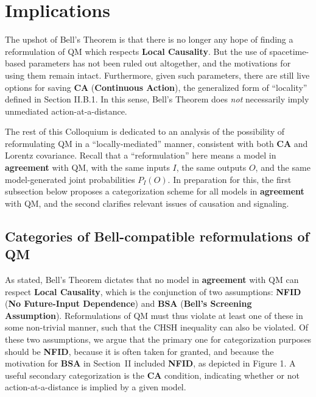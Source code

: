 \documentclass[onecolumn, nofootinbib, 12pt]{revtex4-1}
\begin{document}
\section{Implications}
\label{sec:aftermath}

The upshot of Bell's Theorem is that there is no longer any hope of finding a reformulation of QM which respects {\bf Local Causality}.  But the use of spacetime-based parameters has not been ruled out altogether, and the motivations for using them remain intact.  Furthermore, given such parameters, there are still live options for saving {\bf CA} ({\bf Continuous Action}), the generalized form of ``locality'' defined in Section II.B.1.  In this sense, Bell's Theorem does {\em not} necessarily imply unmediated action-at-a-distance.

The rest of this Colloquium is dedicated to an analysis of the possibility of reformulating QM in a ``locally-mediated'' manner, consistent with both {\bf CA} and Lorentz covariance.  Recall that a ``reformulation'' here means a model in {\bf agreement} with QM, with the same inputs $I$, the same outputs $O$, and the same model-generated joint probabilities $P_I(O)$.  In preparation for this, the first subsection below proposes a categorization scheme for all models in {\bf agreement} with QM, and the second clarifies relevant issues of causation and signaling.

\subsection{Categories of Bell-compatible reformulations of QM}
\label{sec:categories}

As stated, Bell's Theorem dictates that no model in {\bf agreement} with QM can respect {\bf Local Causality}, which is the conjunction of two assumptions: {\bf NFID} ({\bf No Future-Input Dependence}) and {\bf BSA} ({\bf Bell's Screening Assumption}).  Reformulations of QM must thus violate at least one of these in some non-trivial manner, such that the CHSH inequality can also be violated.  Of these two assumptions, we argue that the primary one for categorization purposes should be {\bf NFID}, because it is often taken for granted, and because the motivation for {\bf BSA} in Section~II included {\bf NFID}, as depicted in Figure 1.  A useful secondary categorization is the {\bf CA} condition, indicating whether or not action-at-a-distance is implied by a given model.  
\end{document}
